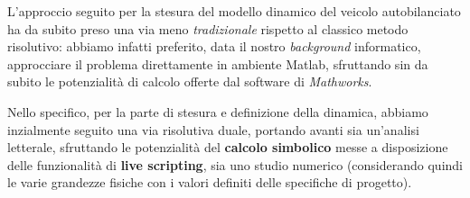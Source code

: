 L'approccio seguito per la stesura del modello dinamico del veicolo autobilanciato ha da subito preso una via meno \textit{tradizionale} rispetto al classico metodo risolutivo: abbiamo infatti preferito, data il nostro \textit{background} informatico, approcciare il problema direttamente in ambiente Matlab, sfruttando sin da subito le potenzialità di calcolo offerte dal software di \textit{Mathworks}.

Nello specifico, per la parte di stesura e definizione della dinamica, abbiamo inzialmente seguito una via risolutiva duale, portando avanti sia un'analisi letterale, sfruttando le potenzialità del \textbf{calcolo simbolico} messe a disposizione delle funzionalità di \textbf{live scripting}, sia uno studio numerico (considerando quindi le varie grandezze fisiche con i valori definiti delle specifiche di progetto).

